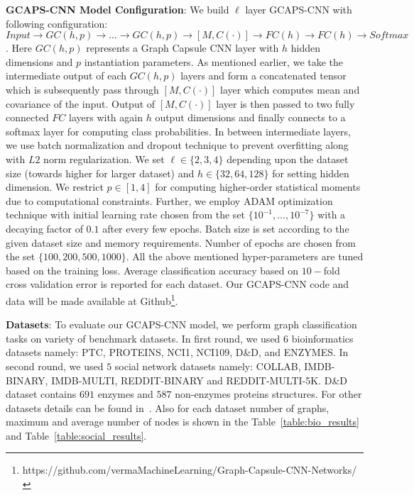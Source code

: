 \documentclass{article}
\begin{document}
\noindent \textbf{GCAPS-CNN Model Configuration}: We build  $\ell$ layer GCAPS-CNN     with following configuration: $Input \rightarrow GC(h,p) \rightarrow \dots \rightarrow GC(h,p) \rightarrow [M,C(\cdot)]\rightarrow FC(h) \rightarrow FC(h) \rightarrow Softmax$. Here $GC(h,p)$ represents a Graph Capsule CNN layer with $h$ hidden dimensions and $p$ instantiation parameters. As mentioned earlier, we take the intermediate output of each $GC(h,p)$ layers and form a concatenated tensor    which is subsequently pass through $ [M,C(\cdot)]$ layer which computes mean and covariance of the input. Output of $ [M,C(\cdot)]$ layer   is then  passed to two fully connected $FC$ layers  with again $h$ output dimensions and finally connects to a  softmax layer for computing class probabilities. In between intermediate layers, we use batch normalization and  dropout  technique to prevent overfitting along with $L2$ norm regularization. We set $\ell\in \{2, 3, 4\}$ depending upon the dataset size (towards higher   for larger dataset) and $h\in \{32, 64, 128\}$ for setting hidden dimension. We restrict $p\in [1, 4]$ for computing higher-order statistical moments due to computational constraints. Further, we employ ADAM optimization technique with  initial learning rate chosen from the set $\{10^{-1},\dots, 10^{-7}\}$ with a   decaying factor of $0.1$ after every few   epochs. Batch size is set according to the given dataset size and memory requirements. Number of epochs are  chosen from the set $\{100, 200, 500, 1000\}$. All the above mentioned hyper-parameters are tuned based on the training loss. Average classification accuracy based on $10-$fold cross validation error is reported for each dataset.  Our GCAPS-CNN code and data will be made  available at Github\footnote{https://github.com/vermaMachineLearning/Graph-Capsule-CNN-Networks/}.

\noindent \textbf{Datasets}:  To evaluate  our  GCAPS-CNN model, we perform graph classification tasks on variety of benchmark datasets. In first round, we used $6$ bioinformatics   datasets namely:   PTC, PROTEINS, NCI1, NCI109, D\&D, and ENZYMES. In second round, we used $5$   social network datasets namely: COLLAB, IMDB-BINARY, IMDB-MULTI, REDDIT-BINARY and  REDDIT-MULTI-5K. D\&D dataset contains $691$ enzymes and $587$ non-enzymes proteins structures.  For other datasets  details can be found in~\cite{yanardag2015deep}. Also for each dataset number  of graphs, maximum   and average number of nodes   is  shown in the Table~\ref{table:bio_results} and Table~\ref{table:social_results}. 
\end{document}
